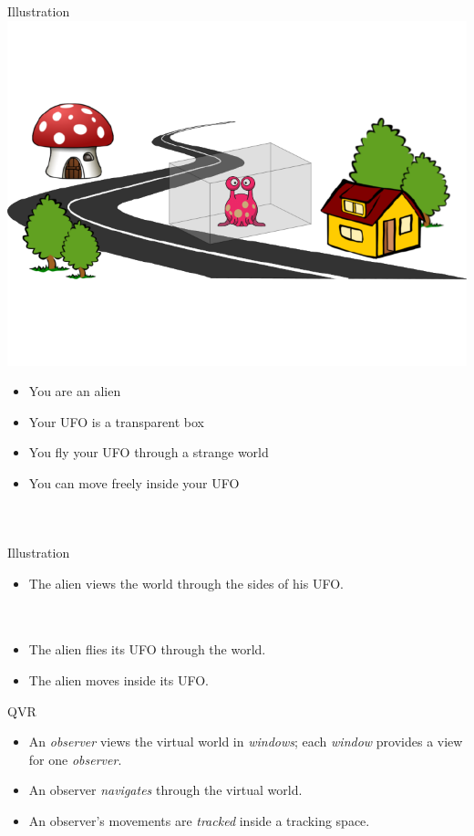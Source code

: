 \documentclass[utf8,stillsansserifmath,fleqn,t]{beamer}
\begin{document}
\begin{frame}
\frametitle{\insertsection}
Illustration
\includegraphics[width=\textwidth]{./fig/scene.pdf}
\vspace*{-4ex}
\begin{itemize}
\item You are an alien
\item Your UFO is a transparent box
\item You fly your UFO through a strange world
\item You can move freely inside your UFO
\end{itemize}
\end{frame}

\begin{frame}
\frametitle{\insertsection}
~\\
\begin{minipage}{0.49\textwidth}
\centerline{Illustration}\vspace{1ex}
\begin{itemize}
\item The alien views the world through the sides of his UFO.\\~\\~
\item The alien flies its UFO through the world.
\item The alien moves inside its UFO.
\end{itemize}
\end{minipage}\hfill
\begin{minipage}{0.49\textwidth}
\centerline{QVR}\vspace{1ex}
\begin{itemize}
\item An \emph{observer} views the virtual world in \emph{windows};
each \emph{window} provides a view for one \emph{observer}.
\item An observer \emph{navigates} through the virtual world.
\item An observer's movements are \emph{tracked} inside a tracking space.
\end{itemize}
\end{minipage}
\end{frame}
\end{document}
